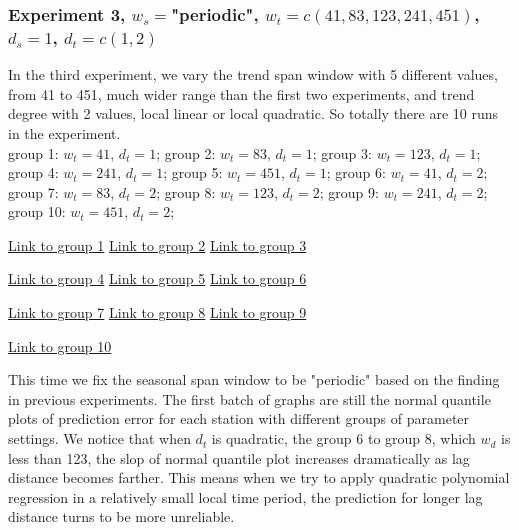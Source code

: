 \subsubsection{Experiment 3,  
\textmd{$w_s=$"periodic", $w_t=c(41, 83, 123, 241, 451)$, $d_s=1$, $d_t=c(1,2)$}
}
In the third experiment, we vary the trend span window with 5 different values, 
from 41 to 451, much wider range than the first two experiments, and trend
degree with 2 values, local linear or local quadratic. So totally there are 10
runs in the experiment.
\\
group 1: $w_t = 41$, $d_t = 1$;
group 2: $w_t = 83$, $d_t = 1$;
group 3: $w_t = 123$, $d_t = 1$;\\
group 4: $w_t = 241$, $d_t = 1$;
group 5: $w_t = 451$, $d_t = 1$;
group 6: $w_t = 41$, $d_t = 2$;\\
group 7: $w_t = 83$, $d_t = 2$;
group 8: $w_t = 123$, $d_t = 2$;
group 9: $w_t = 241$, $d_t = 2$;\\
group 10: $w_t = 451$, $d_t = 2$;
\begin{framed}
\begin{center}
  \href{../plots/a1950/E3/QQ.error.tmax.group.1.pdf}{Link to group 1} 
  \;\;\;\;\;\;\;\;\;\;
  \href{../plots/a1950/E3/QQ.error.tmax.group.2.pdf}{Link to group 2} 
  \;\;\;\;\;\;\;\;\;\;
  \href{../plots/a1950/E3/QQ.error.tmax.group.3.pdf}{Link to group 3}
\end{center}
\begin{center}
  \href{../plots/a1950/E3/QQ.error.tmax.group.4.pdf}{Link to group 4} 
  \;\;\;\;\;\;\;\;\;\;
  \href{../plots/a1950/E3/QQ.error.tmax.group.5.pdf}{Link to group 5} 
  \;\;\;\;\;\;\;\;\;\;
  \href{../plots/a1950/E3/QQ.error.tmax.group.6.pdf}{Link to group 6}
\end{center}
\begin{center}
  \href{../plots/a1950/E3/QQ.error.tmax.group.7.pdf}{Link to group 7} 
  \;\;\;\;\;\;\;\;\;\;
  \href{../plots/a1950/E3/QQ.error.tmax.group.8.pdf}{Link to group 8} 
  \;\;\;\;\;\;\;\;\;\;
  \href{../plots/a1950/E3/QQ.error.tmax.group.9.pdf}{Link to group 9}
\end{center}
\begin{center}
  \href{../plots/a1950/E3/QQ.error.tmax.group.10.pdf}{Link to group 10}  
  \label{QQ.error.laggroup}
\end{center}
\end{framed}
This time we fix the seasonal span window to be "periodic" based on the finding
in previous experiments. The first batch of graphs are still the normal quantile
plots of prediction error for each station with different groups of parameter
settings. We notice that when $d_t$ is quadratic, the group 6 to group 8, which
$w_d$ is less than 123, the slop of normal quantile plot increases dramatically
as lag distance becomes farther. This means when we try to apply quadratic 
polynomial regression in a relatively small local time period, the prediction 
for longer lag distance turns to be more unreliable.

